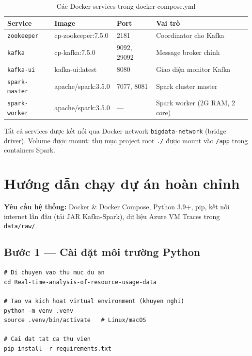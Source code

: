 \documentclass[12pt,a4paper]{article}
\begin{document}
\begin{table}[H]
\centering
\begin{tabularx}{\linewidth}{l l l X}
\toprule
\textbf{Service} & \textbf{Image} & \textbf{Port} & \textbf{Vai trò} \\
\midrule
\texttt{zookeeper} & cp-zookeeper:7.5.0 & 2181 & Coordinator cho Kafka \\
\texttt{kafka} & cp-kafka:7.5.0 & 9092, 29092 & Message broker chính \\
\texttt{kafka-ui} & kafka-ui:latest & 8080 & Giao diện monitor Kafka \\
\texttt{spark-master} & apache/spark:3.5.0 & 7077, 8081 & Spark cluster master \\
\texttt{spark-worker} & apache/spark:3.5.0 & — & Spark worker (2G RAM, 2 core) \\
\bottomrule
\end{tabularx}
\caption{Các Docker services trong docker-compose.yml}
\end{table}

Tất cả services được kết nối qua Docker network \texttt{bigdata-network} (bridge driver). Volume được mount: thư mục project root \texttt{./} được mount vào \texttt{/app} trong containers Spark.

\section{Hướng dẫn chạy dự án hoàn chỉnh}

\begin{notebox}
\textbf{Yêu cầu hệ thống:} Docker \& Docker Compose, Python 3.9+, pip, kết nối internet lần đầu (tải JAR Kafka-Spark), dữ liệu Azure VM Traces trong \texttt{data/raw/}.
\end{notebox}

\subsection{Bước 1 — Cài đặt môi trường Python}

\begin{lstlisting}[style=bash, caption={Cài đặt dependencies}]
# Di chuyen vao thu muc du an
cd Real-time-analysis-of-resource-usage-data

# Tao va kich hoat virtual environment (khuyen nghi)
python -m venv .venv
source .venv/bin/activate   # Linux/macOS

# Cai dat tat ca thu vien
pip install -r requirements.txt
\end{lstlisting}
\end{document}
